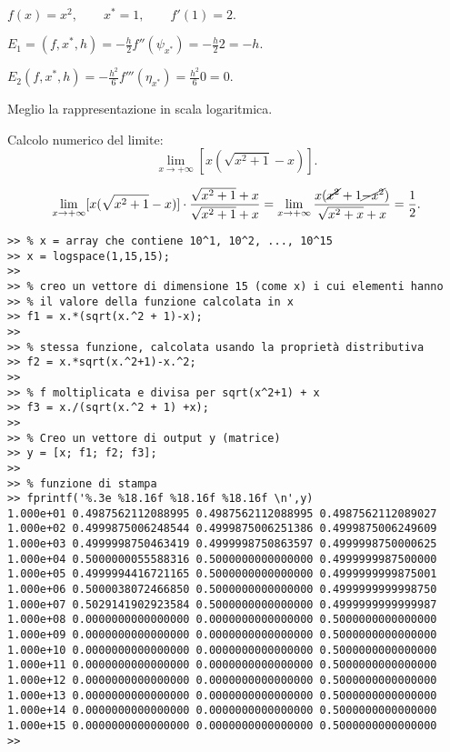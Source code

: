 \begin{exe}
\begin{flushleft}
$f(x) = x^2, \qquad x^* = 1, \qquad f'(1) = 2.$
\end{flushleft}
\begin{flushleft}
$E_1 = (f, x^*, h) = - \frac{h}{2}f''(\psi_{x^*}) = - \frac{h}{2}2 = -h.$
\end{flushleft}
\begin{flushleft}
$E_{2}(f, x^*, h) = - \frac{h^2}{6}f'''(\eta_{x^*})
= \frac{h^2}{6}0 = 0.$
\end{flushleft}

\end{exe}


Meglio la rappresentazione in scala logaritmica.


\begin{ese}\label{esercizio4-6}
Calcolo numerico del limite: 
\[\lim_{x \to +\infty}[x(\sqrt{x^2+1}-x)].\]



\[
\lim_{x \to +\infty}[x(\sqrt{x^2+1}-x)] \cdot 
\frac{\sqrt{x^2+1}+x}{\sqrt{x^2+1}+x}
= \lim_{x \to +\infty}\frac{x (\cancel{x^2} + 1 \cancel{- x^2})}{\sqrt{x^2+x}+x}
= \frac{1}{2}.
\]
\begin{codice}
\begin{verbatim}
>> % x = array che contiene 10^1, 10^2, ..., 10^15
>> x = logspace(1,15,15); 
>> 
>> % creo un vettore di dimensione 15 (come x) i cui elementi hanno
>> % il valore della funzione calcolata in x
>> f1 = x.*(sqrt(x.^2 + 1)-x);
>> 
>> % stessa funzione, calcolata usando la proprietà distributiva
>> f2 = x.*sqrt(x.^2+1)-x.^2;
>> 
>> % f moltiplicata e divisa per sqrt(x^2+1) + x
>> f3 = x./(sqrt(x.^2 + 1) +x);
>> 
>> % Creo un vettore di output y (matrice)
>> y = [x; f1; f2; f3];
>> 
>> % funzione di stampa
>> fprintf('%.3e %18.16f %18.16f %18.16f \n',y)
1.000e+01 0.4987562112088995 0.4987562112088995 0.4987562112089027 
1.000e+02 0.4999875006248544 0.4999875006251386 0.4999875006249609 
1.000e+03 0.4999998750463419 0.4999998750863597 0.4999998750000625 
1.000e+04 0.5000000055588316 0.5000000000000000 0.4999999987500000 
1.000e+05 0.4999994416721165 0.5000000000000000 0.4999999999875001 
1.000e+06 0.5000038072466850 0.5000000000000000 0.4999999999998750 
1.000e+07 0.5029141902923584 0.5000000000000000 0.4999999999999987 
1.000e+08 0.0000000000000000 0.0000000000000000 0.5000000000000000 
1.000e+09 0.0000000000000000 0.0000000000000000 0.5000000000000000 
1.000e+10 0.0000000000000000 0.0000000000000000 0.5000000000000000 
1.000e+11 0.0000000000000000 0.0000000000000000 0.5000000000000000 
1.000e+12 0.0000000000000000 0.0000000000000000 0.5000000000000000 
1.000e+13 0.0000000000000000 0.0000000000000000 0.5000000000000000 
1.000e+14 0.0000000000000000 0.0000000000000000 0.5000000000000000 
1.000e+15 0.0000000000000000 0.0000000000000000 0.5000000000000000 
>> 
\end{verbatim}
\end{codice}
\end{ese}


